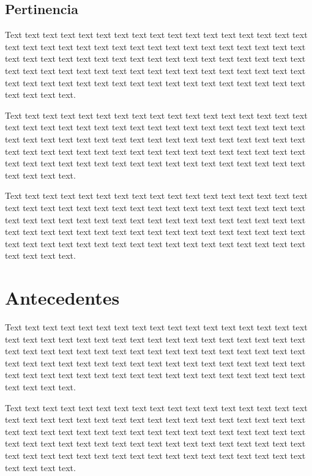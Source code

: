 \documentclass[12pt,a4paper]{article}
\begin{document}
\subsection{Pertinencia}
\label{sec:4}
Text text text text text text text text text text text text text text text text text text text text text text text text text text text text text text text text text text text text text text text text text text text text text text text text text text text text text text text text text text text text text text text text text text text text text text text text text text text text text text text text text text text text text text text text text.

Text text text text text text text text text text text text text text text text text text text text text text text text text text text text text text text text text text text text text text text text text text text text text text text text text text text text text text text text text text text text text text text text text text text text text text text text text text text text text text text text text text text text text text text text text.

Text text text text text text text text text text text text text text text text text text text text text text text text text text text text text text text text text text text text text text text text text text text text text text text text text text text text text text text text text text text text text text text text text text text text text text text text text text text text text text text text text text text text text text text text text.


\section{Antecedentes}
\label{sec:5}
Text text text text text text text text text text text text text text text text text text text text text text text text text text text text text text text text text text text text text text text text text text text text text text text text text text text text text text text text text text text text text text text text text text text text text text text text text text text text text text text text text text text text text text text text text.

Text text text text text text text text text text text text text text text text text text text text text text text text text text text text text text text text text text text text text text text text text text text text text text text text text text text text text text text text text text text text text text text text text text text text text text text text text text text text text text text text text text text text text text text text text.
\end{document}
